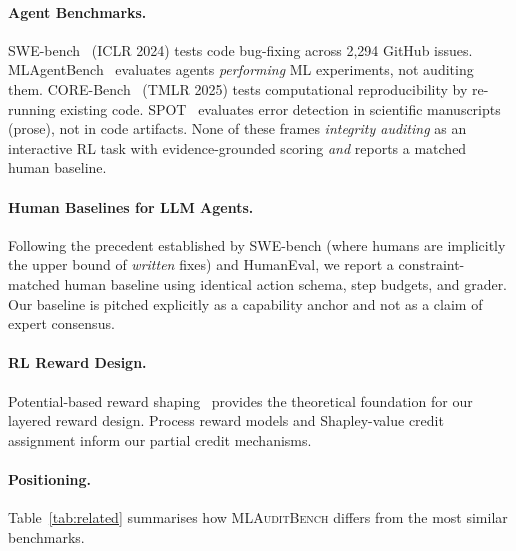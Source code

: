 \documentclass{article}
\begin{document}
\paragraph{Agent Benchmarks.}
SWE-bench~\cite{jimenez2024swebench} (ICLR 2024) tests code bug-fixing
across 2,294 GitHub issues.  MLAgentBench~\cite{huang2024mlagentbench}
evaluates agents \emph{performing} ML experiments, not auditing them.
CORE-Bench~\cite{kapoor2024corebench} (TMLR 2025) tests computational
reproducibility by re-running existing code.  SPOT~\cite{spot2025}
evaluates error detection in scientific manuscripts (prose), not in code
artifacts.  None of these frames \emph{integrity auditing} as an
interactive RL task with evidence-grounded scoring \emph{and} reports a
matched human baseline.

\paragraph{Human Baselines for LLM Agents.}
Following the precedent established by SWE-bench (where humans are
implicitly the upper bound of \emph{written} fixes) and HumanEval, we
report a constraint-matched human baseline using identical action
schema, step budgets, and grader.  Our baseline is pitched explicitly as
a capability anchor and not as a claim of expert consensus.

\paragraph{RL Reward Design.}
Potential-based reward shaping~\cite{ng1999policy} provides the
theoretical foundation for our layered reward design.  Process reward
models and Shapley-value credit assignment inform our partial credit mechanisms.

\paragraph{Positioning.}
Table~\ref{tab:related} summarises how \textsc{MLAuditBench} differs from
the most similar benchmarks.
\end{document}
